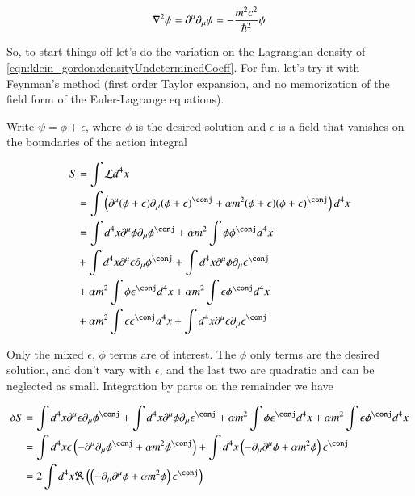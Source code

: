 \begin{align*}
\nabla^2 \psi = \partial^\mu \partial_\mu \psi = -\frac{m^2 c^2}{\hbar^2} \psi
\end{align*}


So, to start things off let's do the variation on the Lagrangian density of \ref{eqn:klein_gordon:densityUndeterminedCoeff}.  For fun, let's try it with Feynman's method (first order Taylor expansion, and no memorization
of the field form of the Euler-Lagrange equations).

Write $\psi = \phi + \epsilon$, where $\phi$ is the desired solution and $\epsilon$ is a field that
vanishes on the boundaries of the action integral

\begin{align*}
S
&= \int \LL d^4 x \\
&=
\int \left( \partial^\mu (\phi + \epsilon) \partial_\mu (\phi + \epsilon)^\conj + \alpha m^2 (\phi + \epsilon) (\phi + \epsilon)^\conj \right) d^4 x \\
&=
\int d^4 x \partial^\mu \phi \partial_\mu \phi^\conj
+ \alpha m^2 \int \phi \phi^\conj  d^4 x \\
&+ \int d^4 x \partial^\mu \epsilon \partial_\mu \phi^\conj
+ \int d^4 x \partial^\mu \phi \partial_\mu \epsilon^\conj  \\
&+ \alpha m^2 \int \phi \epsilon^\conj  d^4 x
+ \alpha m^2 \int \epsilon \phi^\conj  d^4 x \\
&+ \alpha m^2 \int \epsilon \epsilon^\conj  d^4 x
+ \int d^4 x \partial^\mu \epsilon \partial_\mu \epsilon^\conj \\
\end{align*}

Only the mixed $\epsilon$, $\phi$ terms are of interest.  The $\phi$ only terms are the desired solution, and don't vary with $\epsilon$, and the last two are
quadratic and can be neglected as small.  Integration by parts on the remainder we have

\begin{align*}
\delta S
&=
\int d^4 x \partial^\mu \epsilon \partial_\mu \phi^\conj
+ \int d^4 x \partial^\mu \phi \partial_\mu \epsilon^\conj
+ \alpha m^2 \int \phi \epsilon^\conj  d^4 x
+ \alpha m^2 \int \epsilon \phi^\conj  d^4 x \\
&=
\int d^4 x \epsilon \left( -\partial^\mu \partial_\mu \phi^\conj + \alpha m^2 \phi^\conj \right)
+ \int d^4 x \left( -\partial_\mu \partial^\mu \phi + \alpha m^2 \phi \right) \epsilon^\conj
\\
&=
2 \int d^4 x \Re \left( \left( -\partial_\mu \partial^\mu \phi + \alpha m^2 \phi \right) \epsilon^\conj  \right) \\
\end{align*}

